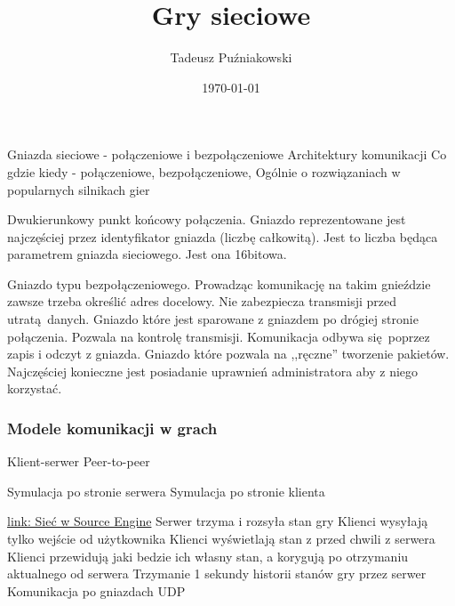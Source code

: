 \documentclass{beamer}
\title[Networking]{Gry sieciowe}
\author{Tadeusz Puźniakowski}
\institute{PJATK}
\date{\today}
\begin{document}
\frame{\titlepage}


\begin{frame}[fragile]
		\BI
		\I Gniazda sieciowe - połączeniowe i bezpołączeniowe
		\I Architektury komunikacji
		\I Co gdzie kiedy - połączeniowe, bezpołączeniowe, 
		\I Ogólnie o rozwiązaniach w popularnych silnikach gier
		\EI
	\EB
\end{frame}


\begin{frame}[fragile]
	Dwukierunkowy punkt końcowy połączenia. Gniazdo reprezentowane jest najczęściej przez identyfikator gniazda (liczbę całkowitą).
	\EB
	Jest to liczba będąca parametrem gniazda sieciowego. Jest ona 16bitowa.
	\EB
\end{frame}

\begin{frame}[fragile]
	Gniazdo typu bezpołączeniowego. Prowadząc komunikację na takim gnieździe zawsze trzeba określić adres docelowy. Nie zabezpiecza transmisji przed utratą danych.
	\EB
	Gniazdo które jest sparowane z gniazdem po drógiej stronie połączenia. Pozwala na kontrolę transmisji. Komunikacja odbywa się poprzez zapis i odczyt z gniazda.
	\EB
	Gniazdo które pozwala na ,,ręczne'' tworzenie pakietów. Najczęściej konieczne jest posiadanie uprawnień administratora aby z niego korzystać.
	\EB
\end{frame}

\begin{frame}[fragile]
	\frametitle{Modele komunikacji w grach}
	\BI
	\I Klient-serwer
	\I Peer-to-peer
	\EI
	
	\BI
	\I Symulacja po stronie serwera
	\I Symulacja po stronie klienta
	\EI
\end{frame}

\begin{frame}[fragile]
		\href{https://developer.valvesoftware.com/wiki/Source\_Multiplayer\_Networking}{link: Sieć w Source Engine}
		\BI
		\I Serwer trzyma i rozsyła stan gry
		\I Klienci wysyłają tylko wejście od użytkownika
		\I Klienci wyświetlają stan z przed chwili z serwera
		\I Klienci przewidują jaki bedzie ich własny stan, a korygują po otrzymaniu aktualnego od serwera
		\I Trzymanie 1 sekundy historii stanów gry przez serwer
		\EI
		Komunikacja po gniazdach UDP
	\EB
\end{frame}
\end{document}
